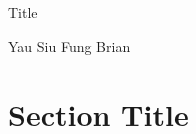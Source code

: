 \documentclass[12pt, a4paper]{article}
\begin{document}
\doublespace
\begin{center}
{\Large Title}

{\large Yau Siu Fung Brian}
\end{center}

\onehalfspace
\section{Section Title}
\end{document}
